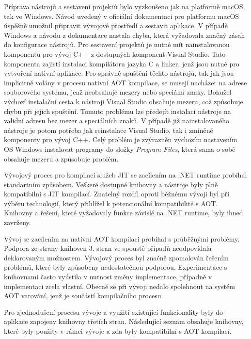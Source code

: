 Příprava nástrojů a sestavení projektů bylo vyzkoušeno jak na platformě macOS, tak ve Windows. Návod uvedený v oficiální dokumentaci pro platformu macOS úspěšně umožnil připravit vývojové prostředí a sestavit aplikace. \cite{netdocsnativeguide} V případě Windows a návodu z dokumentace nastala chyba, která vyžadovala značný zásah do konfigurace nástrojů. Pro sestavení projektů je nutné mít nainstalovanou komponentu pro vývoj C++ z dostupných komponent Visual Studio. Tato komponenta zajistí instalaci kompilátoru jazyka C a linker, jenž jsou nutné pro vytvoření nativní aplikace. Pro správné spuštění těchto nástrojů, tak jak jsou implicitně volány v procesu nativní AOT kompilace, se musejí nacházet na adrese souborového systému, jenž neobsahuje mezery nebo speciální znaky. Bohužel výchozí instalační cesta k nástroji Visual Studio obsahuje mezeru, což způsobuje chybu při jejich spuštění. Tomuto problému lze předejít instalací nástroje na validní adresu bez mezer a speciálních znaků. V případě již nainstalovaného nástroje je potom potřeba jak reinstalace Visual Studio, tak i zmíněné komponenty pro vývoj C++. Celý problém je zvýrazněn výchozím nastavením OS Windows instalovat programy do složky \emph{Program Files}, která sama o sobě obsahuje mezeru a způsobuje problém.


Vývojový proces pro kompilaci služeb JIT se zacílením na .NET runtime probíhal standartním způsobem. Veškeré dostupné knihovny a nástroje byly plně kompatibilní s JIT kompilací. Znatelný rozdíl oproti běžnému vývoji byl při výběru technologií, který přihlížel k potencionální kompatibilitě s AOT. Knihovny a řešení, které vyžadovaly funkce závislé na .NET runtime, byly ihned zavrženy.


Vývoj se zacílením na nativní AOT kompilaci probíhal s průběžnými problémy. Podpora ze strany knihoven 3. stran ve spoustě případů neodpovídala deklarovaným možnostem. Vývojový proces byl značně zpomalován řešením problémů, které byly způsobeny nedostatečnou podporou. Experimentace s knihovnami často vyústila v nutnost změny implementace, případně v implementaci zcela vlastní. Obecně se při vývoji nedalo spolehnout na systém AOT varování, jenž je součástí kompilačního procesu. 


Pro zjednodušení procesu vývoje a využití existující funkcionality byly do aplikace zapojeny knihovny třetích stran. Následující seznam obsahuje knihovny, které byly použity v rámci vývoje a zda byly kompatibilní s AOT kompilací.

